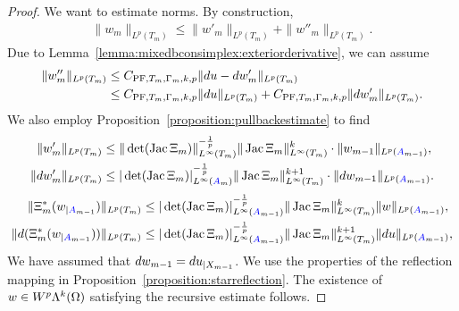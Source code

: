 \documentclass[10pt,letterpaper]{article}
\begin{document}
\begin{proof}
    We want to estimate norms. 
    By construction,
    \begin{align*}
        \| w_{m} \|_{L^{p}(T_{m})}
        \leq  
        \| w'_{m} \|_{L^{p}(T_{m})}
        + 
        \| w''_{m} \|_{L^{p}(T_{m})}
        .
    \end{align*}
    Due to Lemma~\ref{lemma:mixedbconsimplex:exteriorderivative},
    we can assume 
    \begin{align*}
        \| w''_{m} \|_{L^{p}(T_{m})} 
        &
        \leq 
        C_{{\rm PF},T_{m},\Gamma_{m},k,p} \| d u - d w'_{m} \|_{L^{p}(T_{m})}
        \\&
        \leq 
        C_{{\rm PF},T_{m},\Gamma_{m},k,p} \| d u      \|_{L^{p}(T_{m})} 
        + 
        C_{{\rm PF},T_{m},\Gamma_{m},k,p} \| d w'_{m} \|_{L^{p}(T_{m})} 
        .
    \end{align*}
    We also employ Proposition~\ref{proposition:pullbackestimate} to find 
    \begin{align*}
        \| w'_{m} \|_{L^{p}(T_{m})}
        &\leq 
        \|\det(\operatorname{{\rm Jac}} \Xi_{m}  )\|_{L^{\infty}(T_{m})}^{-\frac 1 p} 
        \| \operatorname{{\rm Jac}} \Xi_{m} \|_{L^{\infty}(T_{m})}^{k}
        \cdot 
        \| w_{m-1} \|_{L^{p}({\color{blue}A}_{m-1})}
        ,
        \\
        \| d w'_{m} \|_{L^{p}(T_{m})}
        &\leq 
        |\det(\operatorname{{\rm Jac}} \Xi_{m}  )|^{-\frac 1 p}_{L^{\infty}({\color{blue}A}_{m})} 
        \| \operatorname{{\rm Jac}} \Xi_{m} \|_{L^{\infty}(T_{m})}^{k+1}
        \cdot 
        \| d w_{m-1} \|_{L^{p}({\color{blue}A}_{m-1})}
        .
    \end{align*}
    \begin{align*}
        \| \Xi_{m}^{\ast}(w_{|{\color{blue}A}_{m-1}}) \|_{L^{p}(T_{m})}
        &\leq 
        |\det(\operatorname{{\rm Jac}} \Xi_{m}  )|^{-\frac 1 p}_{L^{\infty}({\color{blue}A}_{m-1})} 
        \| \operatorname{{\rm Jac}} \Xi_{m} \|^{k}_{L^{\infty}(T_{m})}
        \| w \|_{L^{p}({\color{blue}A}_{m-1})}
        ,
        \\
        \| d (\Xi_{m}^{\ast}(w_{|{\color{blue}A}_{m-1}})) \|_{L^{p}(T_{m})}
        &\leq 
        |\det(\operatorname{{\rm Jac}} \Xi_{m}  )|^{-\frac 1 p}_{L^{\infty}({\color{blue}A}_{m-1})} 
        \| \operatorname{{\rm Jac}} \Xi_{m} \|^{k+1}_{L^{\infty}(T_{m})}
        \| d u \|_{L^{p}({\color{blue}A}_{m-1})}
        ,
    \end{align*}
    We have assumed that $d w_{m-1} = d u_{|X_{m-1}}$. 
    We use the properties of the reflection mapping in Proposition~\ref{proposition:starreflection}. 
    The existence of $w \in W^{p}\Lambda^{k}(\Omega)$ satisfying the recursive estimate follows. 
\end{proof}
\end{document}
